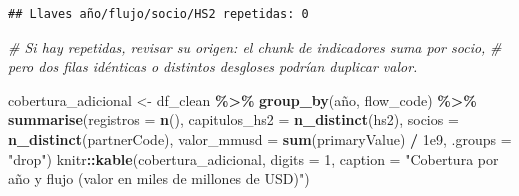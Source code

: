 \documentclass[
]{article}
\newenvironment{Shaded}{\begin{snugshade}}{\end{snugshade}}
\newcommand{\AttributeTok}[1]{\textcolor[rgb]{0.13,0.29,0.53}{#1}}
\newcommand{\CommentTok}[1]{\textcolor[rgb]{0.56,0.35,0.01}{\textit{#1}}}
\newcommand{\DecValTok}[1]{\textcolor[rgb]{0.00,0.00,0.81}{#1}}
\newcommand{\FloatTok}[1]{\textcolor[rgb]{0.00,0.00,0.81}{#1}}
\newcommand{\FunctionTok}[1]{\textcolor[rgb]{0.13,0.29,0.53}{\textbf{#1}}}
\newcommand{\NormalTok}[1]{#1}
\newcommand{\OtherTok}[1]{\textcolor[rgb]{0.56,0.35,0.01}{#1}}
\newcommand{\SpecialCharTok}[1]{\textcolor[rgb]{0.81,0.36,0.00}{\textbf{#1}}}
\newcommand{\StringTok}[1]{\textcolor[rgb]{0.31,0.60,0.02}{#1}}
\begin{document}
\begin{verbatim}
## Llaves año/flujo/socio/HS2 repetidas: 0
\end{verbatim}

\begin{Shaded}
\begin{Highlighting}[]
\CommentTok{\# Si hay repetidas, revisar su origen: el chunk de indicadores suma por socio,}
\CommentTok{\# pero dos filas idénticas o distintos desgloses podrían duplicar valor.}

\NormalTok{cobertura\_adicional }\OtherTok{\textless{}{-}}\NormalTok{ df\_clean }\SpecialCharTok{\%\textgreater{}\%} \FunctionTok{group\_by}\NormalTok{(año, flow\_code) }\SpecialCharTok{\%\textgreater{}\%}
  \FunctionTok{summarise}\NormalTok{(}\AttributeTok{registros =} \FunctionTok{n}\NormalTok{(), }\AttributeTok{capitulos\_hs2 =} \FunctionTok{n\_distinct}\NormalTok{(hs2),}
            \AttributeTok{socios =} \FunctionTok{n\_distinct}\NormalTok{(partnerCode),}
            \AttributeTok{valor\_mmusd =} \FunctionTok{sum}\NormalTok{(primaryValue) }\SpecialCharTok{/} \FloatTok{1e9}\NormalTok{, }\AttributeTok{.groups =} \StringTok{"drop"}\NormalTok{)}
\NormalTok{knitr}\SpecialCharTok{::}\FunctionTok{kable}\NormalTok{(cobertura\_adicional, }\AttributeTok{digits =} \DecValTok{1}\NormalTok{,}
             \AttributeTok{caption =} \StringTok{"Cobertura por año y flujo (valor en miles de millones de USD)"}\NormalTok{)}
\end{Highlighting}
\end{Shaded}
\end{document}
